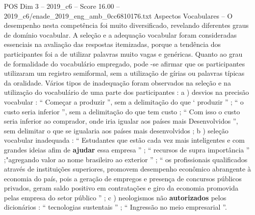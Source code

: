 \begin{textsample}{POS Dim 3 – 2019\_c6 – Score 16.00 – 2019\_c6/enade\_2019\_eng\_amb\_0cc6810176.txt}
Aspectos Vocabulares – O desempenho nesta competência foi muito diversificado, revelando diferentes graus de domínio vocabular.
A seleção e a adequação vocabular foram consideradas essenciais na avaliação das respostas itemizadas, porque a tendência dos participantes foi a de utilizar palavras muito vagas e genéricas.
Quanto ao grau de formalidade do vocabulário empregado, pode -se afirmar que os participantes utilizaram um registro semiformal, sem a utilização de gírias ou palavras típicas da oralidade.
Vários tipos de inadequação foram observados na seleção e na utilização do vocabulário de uma parte dos participantes : a ) desvios na precisão vocabular : “ Começar a produzir ”, sem a delimitação do que ‘ produzir ” ; “ o custo seria inferior ”, sem a delimitação do que tem custo ; “ Com isso o custo seria inferior ao comprador, onde iria igualar aos países mais Desenvolvidos ”, sem delimitar o que se igualaria aos países mais desenvolvidos ; b ) seleção vocabular inadequada : “ Estudantes que estão cada vez mais inteligentes e com grandes ideias afim de \textbf{ajudar} essa empresa ” ; “ recursos de supra importância ” ;"agregando valor ao nome brasileiro ao exterior ” ; “ os profissionais qualificados através de instituições superiores, promovem desempenho econômico abrangente à economia do país, pois a geração de empregos e presença de concursos públicos privados, geram saldo positivo em contratações e giro da economia promovida pelas empresa do setor público ” ; c ) neologismos não \textbf{autorizados} pelos dicionários : “ tecnologias sustentais ” ; “ Ingressão no meio empresarial ”.

\end{textsample}
